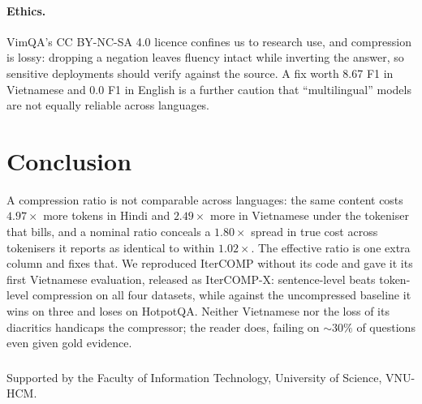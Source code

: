 \documentclass{llncs}
\begin{document}
\paragraph{Ethics.} VimQA's CC BY-NC-SA 4.0 licence confines us to research use,
and compression is lossy: dropping a negation leaves fluency intact while
inverting the answer, so sensitive deployments should verify against the source.
A fix worth 8.67 F1 in Vietnamese and 0.0 F1 in English is a further caution that
``multilingual'' models are not equally reliable across languages.

\vspace{-2mm}


\enlargethispage{4\baselineskip}
\vspace{-3mm}
\section{Conclusion}
\label{sec:conclusion}

A compression ratio is not comparable across languages: the same content costs
$4.97\times$ more tokens in Hindi and $2.49\times$ more in Vietnamese under the
tokeniser that bills, and a nominal ratio conceals a $1.80\times$ spread in true
cost across tokenisers it reports as identical to within $1.02\times$. The
effective ratio is one extra column and fixes that. We reproduced IterCOMP
without its code and gave it its first Vietnamese evaluation, released as
IterCOMP-X: sentence-level beats token-level compression on all four datasets,
while against the uncompressed baseline it wins on three and loses on HotpotQA.
Neither Vietnamese nor the loss of its diacritics handicaps the compressor; the
reader does, failing on ${\sim}30\%$ of questions even given gold evidence.


\vspace{-4.5mm}
\begin{credits}
\subsubsection{\ackname} Supported by the Faculty of Information Technology,
University of Science, VNU-HCM.
\end{credits}

\let\oldthebibliography\thebibliography
\renewcommand{\thebibliography}[1]{%
  \oldthebibliography{#1}%
  \setlength{\itemsep}{4pt plus 1pt minus 0.5pt}%
  \setlength{\parsep}{0pt}}


\end{document}
